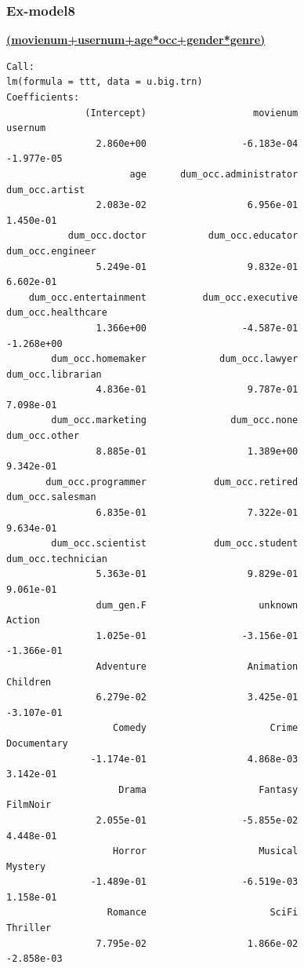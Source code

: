 \documentclass[11pt]{article}
\begin{document}
\subsubsection{Ex-model8}
\textbf{\underline{(movienum+usernum+age*occ+gender*genre)}}
\begin{verbatim}
Call:
lm(formula = ttt, data = u.big.trn)
Coefficients:
              (Intercept)                   movienum                    usernum  
                2.860e+00                 -6.183e-04                 -1.977e-05  
                      age      dum_occ.administrator             dum_occ.artist  
                2.083e-02                  6.956e-01                  1.450e-01  
           dum_occ.doctor           dum_occ.educator           dum_occ.engineer  
                5.249e-01                  9.832e-01                  6.602e-01  
    dum_occ.entertainment          dum_occ.executive         dum_occ.healthcare  
                1.366e+00                 -4.587e-01                 -1.268e+00  
        dum_occ.homemaker             dum_occ.lawyer          dum_occ.librarian  
                4.836e-01                  9.787e-01                  7.098e-01  
        dum_occ.marketing               dum_occ.none              dum_occ.other  
                8.885e-01                  1.389e+00                  9.342e-01  
       dum_occ.programmer            dum_occ.retired           dum_occ.salesman  
                6.835e-01                  7.322e-01                  9.634e-01  
        dum_occ.scientist            dum_occ.student         dum_occ.technician  
                5.363e-01                  9.829e-01                  9.061e-01  
                dum_gen.F                    unknown                     Action  
                1.025e-01                 -3.156e-01                 -1.366e-01  
                Adventure                  Animation                   Children  
                6.279e-02                  3.425e-01                 -3.107e-01  
                   Comedy                      Crime                Documentary  
               -1.174e-01                  4.868e-03                  3.142e-01  
                    Drama                    Fantasy                   FilmNoir  
                2.055e-01                 -5.855e-02                  4.448e-01  
                   Horror                    Musical                    Mystery  
               -1.489e-01                 -6.519e-03                  1.158e-01  
                  Romance                      SciFi                   Thriller  
                7.795e-02                  1.866e-02                 -2.858e-03  

\end{verbatim}
\end{document}
